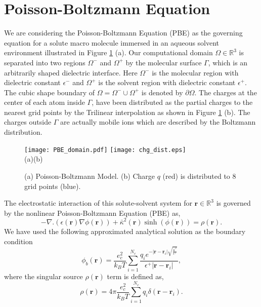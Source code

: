 \section{Poisson-Boltzmann Equation}
We are considering the Poisson-Boltzmann Equation (PBE) as the governing equation for a solute macro molecule immersed in an aqueous solvent environment illustrated in Figure \ref{fig_PBmodel} (a). Our computational domain $\Omega \in \mathbb{R}^3$ is separated into two regions $\Omega^-$ and $\Omega^+$ by the molecular surface $\Gamma$, which is an arbitrarily shaped dielectric interface. Here $\Omega^-$ is the molecular region with dielectric constant $\epsilon^-$ and $\Omega^+$ is the solvent region with dielectric constant $\epsilon^+$. The cubic shape boundary of $\Omega= \Omega^-\cup \Omega^+ $ is denoted by $\partial \Omega$. The charges at the center of each atom inside $\Gamma$, have been distributed as the partial charges to the nearest grid points by the Trilinear interpolation as shown in Figure \ref{fig_PBmodel} (b). The charges outside $\Gamma$ are actually mobile ions which are described by the Boltzmann distribution. 

\begin{figure}[t]
\centering
	\texttt{[image: PBE\_domain.pdf]}
	\hspace{8mm}
	\texttt{[image: chg\_dist.eps]}\\
	(a)\hspace{3.3in}(b)
	\caption{(a) Poisson-Boltzmann Model. (b) Charge $q$ (red) is distributed to 8 grid points (blue).}
	\label{fig_PBmodel}
\end{figure}

The electrostatic interaction of this solute-solvent system for $\textbf{r} \in \mathbb{R}^3$ is governed by the nonlinear Poisson-Boltzmann Equation (PBE) as, 
\begin{equation}
			-\nabla.(\epsilon(\textbf{r})\nabla \phi(\textbf{r}))+\bar\kappa^2(\textbf{r}) \sinh (\phi(\textbf{r}))=\rho(\textbf{r}).\label{pbe} %
\end{equation}
We have used the following approximated analytical solution \cite{Holst1995} as the boundary condition
\begin{equation}
	\phi_b (\textbf{r}) = \frac{e_c^2}{k_B T} \sum_{i=1}^{N_c} \frac{q_i e^{-|\textbf{r}-\textbf{r}_i | \sqrt{\frac{\bar\kappa^2}{\epsilon^+}} }}{\epsilon^{+}|\textbf{r}-\textbf{r}_i|}, \label{bd_cond}
\end{equation}
where the singular source $\rho(\textbf{r})$ term is defined as,
\begin{equation}
	\rho(\textbf{r})= 4\pi \frac{e_c^2}{k_B T}\sum_{i=1}^{N_c} q_i \delta(\textbf{r}-\textbf{r}_i). \label{rho}
\end{equation}

